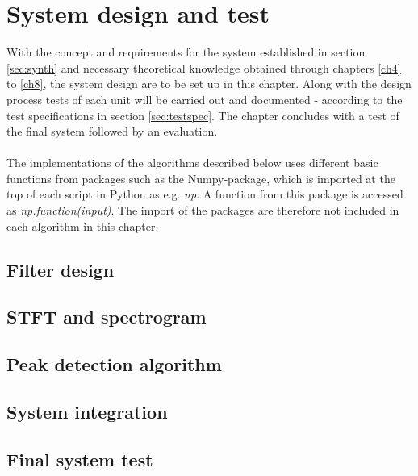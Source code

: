 \chapter{System design and test} \label{ch10}
With the concept and requirements for the system established in section \ref{sec:synth} and necessary theoretical knowledge obtained through chapters \ref{ch4} to \ref{ch8}, the system design are to be set up in this chapter. Along with the design process tests of each unit will be carried out and documented - according to the test specifications in section \ref{sec:testspec}. The chapter concludes with a test of the final system followed by an evaluation.
\\ \\
The implementations of the algorithms described below uses different basic functions from packages such as the Numpy-package, which is imported at the top of each script in Python as e.g. \textit{np}. A function from this package is accessed as \textit{np.function(input)}. The import of the packages are therefore not included in each algorithm in this chapter.



\section{Filter design}


\section{STFT and spectrogram}


\section{Peak detection algorithm}


\section{System integration}


\section{Final system test}


